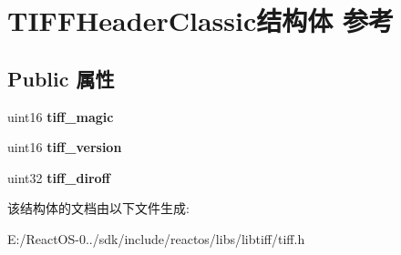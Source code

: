 \hypertarget{struct_t_i_f_f_header_classic}{}\section{T\+I\+F\+F\+Header\+Classic结构体 参考}
\label{struct_t_i_f_f_header_classic}
\subsection*{Public 属性}
\begin{DoxyCompactItemize}
\item 
\mbox{\label{struct_t_i_f_f_header_classic_a23f8e0c949d3ec18a232f9dadeeaf85b}} 
uint16 {\bfseries tiff\+\_\+magic}
\item 
\mbox{\label{struct_t_i_f_f_header_classic_ad4590d6c7e167277b08b0ef7eedc21c4}} 
uint16 {\bfseries tiff\+\_\+version}
\item 
\mbox{\label{struct_t_i_f_f_header_classic_a198ced6040ba4dd3069876894885a595}} 
uint32 {\bfseries tiff\+\_\+diroff}
\end{DoxyCompactItemize}


该结构体的文档由以下文件生成\+:\begin{DoxyCompactItemize}
\item 
E\+:/\+React\+O\+S-\/0../sdk/include/reactos/libs/libtiff/tiff.\+h\end{DoxyCompactItemize}
